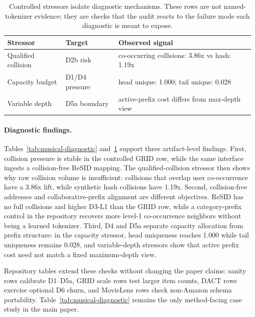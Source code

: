 \begin{table}[t]
\caption{Controlled stressors isolate diagnostic mechanisms. These rows are
not named-tokenizer evidence; they are checks that the audit reacts to the
failure mode each diagnostic is meant to expose.}
\label{tab:controller-stressors}
\small
\setlength{\tabcolsep}{3pt}
\begin{tabular}{@{}>{\raggedright\arraybackslash}p{}>{\raggedright\arraybackslash}p{}>{\raggedright\arraybackslash}p{}@{}}
\toprule
Stressor & Target & Observed signal \\
\midrule
Qualified collision & D2b risk & co-occurring collisions: 3.86x vs hash: 1.19x \\
Capacity budget & D1/D4 pressure & head unique: 1.000; tail unique: 0.028 \\
Variable depth & D5a boundary & active-prefix cost differs from max-depth view \\
\bottomrule
\end{tabular}
\end{table}

\paragraph{Diagnostic findings.}
Tables~\ref{tab:musical-diagnostic} and~\ref{tab:controller-stressors} support
three artifact-level findings. First, collision pressure is stable in the
controlled GRID row, while the same interface ingests a collision-free ReSID
mapping. The qualified-collision stressor then shows why raw collision volume
is insufficient: collisions that overlap user co-occurrence have a 3.86x lift,
while synthetic hash collisions have 1.19x. Second, collision-free addresses
and collaborative-prefix alignment are different objectives. ReSID has no full
collisions and higher D3-L1 than the GRID row, while a category-prefix control
in the repository recovers more level-1 co-occurrence neighbors without being a
learned tokenizer. Third, D4 and D5a separate capacity allocation from prefix
structure: in the capacity stressor, head uniqueness reaches 1.000 while tail
uniqueness remains 0.028, and variable-depth stressors show that active prefix
cost need not match a fixed maximum-depth view.

Repository tables extend these checks without changing the paper claims:
sanity rows calibrate D1--D5a, GRID scale rows test larger item counts, DACT
rows exercise optional D6 churn, and MovieLens rows check non-Amazon schema
portability. Table~\ref{tab:musical-diagnostic} remains the only method-facing
case study in the main paper.
